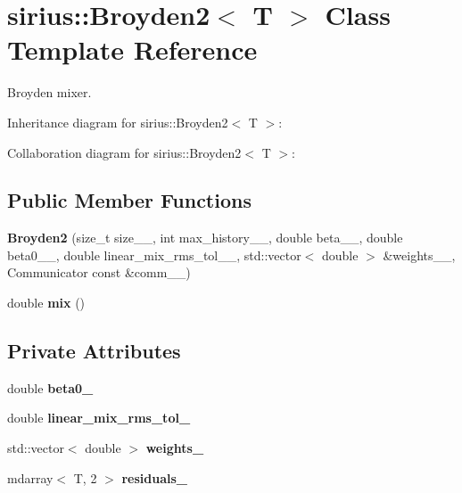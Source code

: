 \hypertarget{classsirius_1_1_broyden2}{}\section{sirius\+:\+:Broyden2$<$ T $>$ Class Template Reference}
\label{classsirius_1_1_broyden2}


Broyden mixer.  




Inheritance diagram for sirius\+:\+:Broyden2$<$ T $>$\+:


Collaboration diagram for sirius\+:\+:Broyden2$<$ T $>$\+:
\subsection*{Public Member Functions}
\begin{DoxyCompactItemize}
\item 
\hypertarget{classsirius_1_1_broyden2_a2d0af3f47dc13d4a346595a4bba8a378}{}{\bfseries Broyden2} (size\+\_\+t size\+\_\+\+\_\+, int max\+\_\+history\+\_\+\+\_\+, double beta\+\_\+\+\_\+, double beta0\+\_\+\+\_\+, double linear\+\_\+mix\+\_\+rms\+\_\+tol\+\_\+\+\_\+, std\+::vector$<$ double $>$ \&weights\+\_\+\+\_\+, Communicator const \&comm\+\_\+\+\_\+)\label{classsirius_1_1_broyden2_a2d0af3f47dc13d4a346595a4bba8a378}

\item 
\hypertarget{classsirius_1_1_broyden2_ab7c3ac02d67444d06115de55dc856ad9}{}double {\bfseries mix} ()\label{classsirius_1_1_broyden2_ab7c3ac02d67444d06115de55dc856ad9}

\end{DoxyCompactItemize}
\subsection*{Private Attributes}
\begin{DoxyCompactItemize}
\item 
\hypertarget{classsirius_1_1_broyden2_ae6456ebe346e83aefdd09b0e8ae48b3d}{}double {\bfseries beta0\+\_\+}\label{classsirius_1_1_broyden2_ae6456ebe346e83aefdd09b0e8ae48b3d}

\item 
\hypertarget{classsirius_1_1_broyden2_a0c1a4fe0b16b92a619f5af6f3a58e726}{}double {\bfseries linear\+\_\+mix\+\_\+rms\+\_\+tol\+\_\+}\label{classsirius_1_1_broyden2_a0c1a4fe0b16b92a619f5af6f3a58e726}

\item 
\hypertarget{classsirius_1_1_broyden2_af87ec75627458402a4c89d3714b43d48}{}std\+::vector$<$ double $>$ {\bfseries weights\+\_\+}\label{classsirius_1_1_broyden2_af87ec75627458402a4c89d3714b43d48}

\item 
\hypertarget{classsirius_1_1_broyden2_aad08602602bffea81253e7eba381bb4f}{}mdarray$<$ T, 2 $>$ {\bfseries residuals\+\_\+}\label{classsirius_1_1_broyden2_aad08602602bffea81253e7eba381bb4f}

\end{DoxyCompactItemize}
